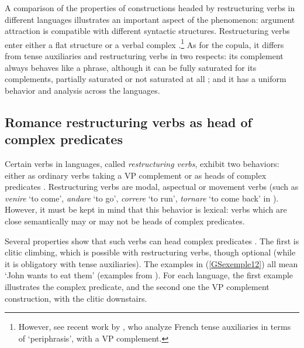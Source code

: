 A comparison of the properties of constructions headed by restructuring verbs in different  languages illustrates an important aspect of the phenome\-non: argument attraction is compatible with different syntactic structures. Restructuring verbs enter either a flat structure or a verbal complex \citep{Monachesi98a, abeille2001deux, AG2010}.\footnote{However, see recent work by \citet{aguila20}, who analyze French tense auxiliaries in terms of `periphrasis', with a VP complement.} As for the copula, it differs from tense auxiliaries and restructuring verbs in two respects: its complement always behaves like a phrase, although it can be fully saturated for its complements, partially saturated or not saturated at all \citep{abeille2001varieties, AG2002b-u}; and it has a uniform behavior and analysis across the  languages.

\subsection{Romance restructuring verbs as head of complex predicates} \label{GSsection3.1}

Certain verbs in  languages, called \emph{restructuring verbs}, exhibit two behaviors: either as ordinary verbs taking a VP complement or as heads of complex predicates \citep{rizzi1982issues, aissen1983clause}. Restructuring verbs are modal, aspectual or movement verbs (such as \emph{venire} `to come’, \emph{andare} `to go’, \emph{correre} `to run’, \emph{tornare} `to come back’ in ). However, it must be kept in mind that this behavior is lexical: verbs which are close semantically may or may not be heads of complex predicates. 

Several properties show that such verbs can head complex predicates \citep[323--328]{Monachesi98a}. The first is clitic climbing, which is possible with restructuring verbs, though optional (while it is obligatory with tense auxiliaries). The examples in (\ref{GSexemple12}) all mean `John wants to eat them’ (examples from \citealt[113]{AG2010}). For each language, the first example illustrates the complex predicate, and the second one the VP complement construction, with the clitic downstairs.

\eal 
\settowidth{}
\label{GSexemple12} 
 \label{GSexemple 12a}  
		
